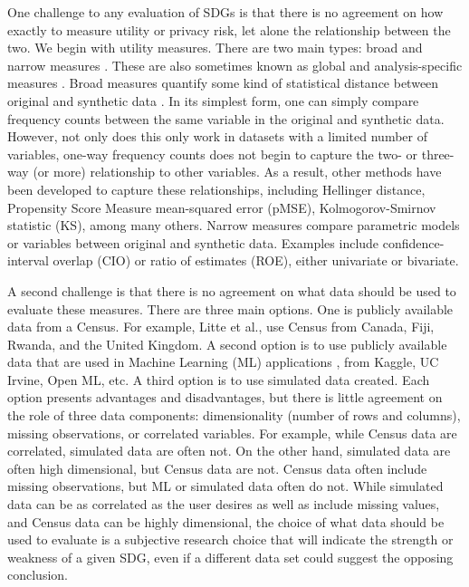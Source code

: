 \documentclass[runningheads]{llncs}
\begin{document}
One challenge to any evaluation of SDGs is that there is no agreement on how exactly to measure utility or privacy risk, let alone the relationship between the two.  We begin with utility measures.  There are two main types: broad and narrow measures \citep{drechsler2009disclosure}.  These are also sometimes known as global and analysis-specific measures \citep{woo2009global}.  Broad measures quantify some kind of statistical distance between original and synthetic data \citep{taub2020impact}.  In its simplest form, one can simply compare frequency counts between the same variable in the original and synthetic data.  However, not only does this only work in datasets with a limited number of variables, one-way frequency counts does not begin to capture the two- or three-way (or more) relationship to other variables.  As a result, other methods have been developed to capture these relationships, including Hellinger distance, Propensity Score Measure mean-squared error (pMSE), Kolmogorov-Smirnov statistic (KS), among many others.  Narrow measures compare parametric models or variables between original and synthetic data.  Examples include confidence-interval overlap (CIO) or ratio of estimates (ROE), either univariate or bivariate.  

A second challenge is that there is no agreement on what data should be used to evaluate these measures.  There are three main options.  One is publicly available data from a Census.  For example, Litte et al., \cite{little2022comparing} use Census from Canada, Fiji, Rwanda, and the United Kingdom.  A second option is to use publicly available data that are used in Machine Learning (ML) applications \citep{dankar2021fake}, from Kaggle, UC Irvine, Open ML, etc.  A third option is to use simulated data created.  Each option presents advantages and disadvantages, but there is little agreement on the role of three data components: dimensionality (number of rows and columns), missing observations, or correlated variables.  For example, while Census data are correlated, simulated data are often not.  On the other hand, simulated data are often high dimensional, but Census data are not.  Census data often include missing observations, but ML or simulated data often do not.  While simulated data can be as correlated as the user desires as well as include missing values, and Census data can be highly dimensional, the choice of what data should be used to evaluate is a subjective research choice that will indicate the strength or weakness of a given SDG, even if a different data set could suggest the opposing conclusion.
\end{document}
